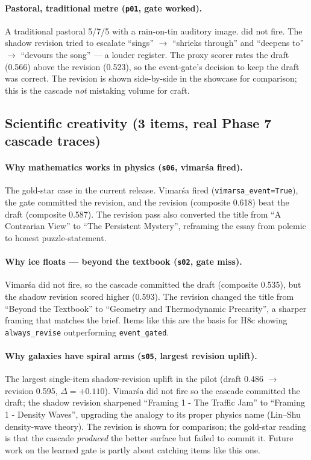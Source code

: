 \paragraph{Pastoral, traditional metre (\texttt{p01}, gate worked).} A traditional pastoral 5/7/5 with a rain-on-tin auditory image.  did not fire. The shadow revision tried to escalate ``sings'' $\to$ ``shrieks through'' and ``deepens to'' $\to$ ``devours the song'' --- a louder register. The proxy scorer rates the draft (0.566) above the revision (0.523), so the event-gate's decision to keep the draft was correct. The revision is shown side-by-side in the showcase for comparison; this is the cascade \emph{not} mistaking volume for craft.

\subsection{Scientific creativity (3 items, real Phase 7 cascade traces)}

\paragraph{Why mathematics works in physics (\texttt{s06}, vimar\'sa fired).} The gold-star case in the current release. Vimar\'sa fired (\texttt{vimarsa\_event=True}), the gate committed the revision, and the revision (composite 0.618) beat the draft (composite 0.587). The revision pass also converted the title from ``A Contrarian View'' to ``The Persistent Mystery'', reframing the essay from polemic to honest puzzle-statement.

\paragraph{Why ice floats --- beyond the textbook (\texttt{s02}, gate miss).} Vimar\'sa did not fire, so the cascade committed the draft (composite 0.535), but the shadow revision scored higher (0.593). The revision changed the title from ``Beyond the Textbook'' to ``Geometry and Thermodynamic Precarity'', a sharper framing that matches the brief. Items like this are the basis for H8c showing \texttt{always\_revise} outperforming \texttt{event\_gated}.

\paragraph{Why galaxies have spiral arms (\texttt{s05}, largest revision uplift).} The largest single-item shadow-revision uplift in the pilot (draft 0.486 $\to$ revision 0.595, $\Delta=+0.110$). Vimar\'sa did not fire so the cascade committed the draft; the shadow revision sharpened ``Framing 1 - The Traffic Jam'' to ``Framing 1 - Density Waves'', upgrading the analogy to its proper physics name (Lin--Shu density-wave theory). The revision is shown for comparison; the gold-star reading is that the cascade \emph{produced} the better surface but failed to commit it. Future work on the learned gate is partly about catching items like this one.
